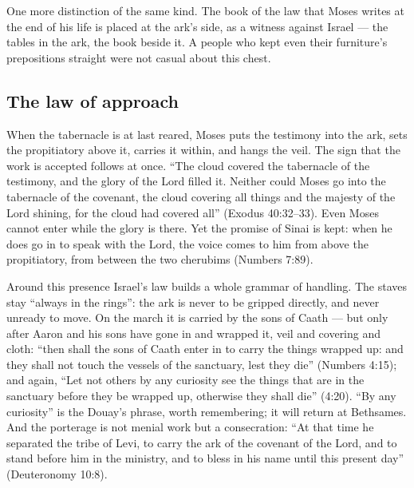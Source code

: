 One more distinction of the same kind. The book of the law that Moses
writes at the end of his life is placed at the ark's side, as a witness
against Israel --- the tables in the ark, the book beside
it. A people who kept even their furniture's
prepositions straight were not casual about this chest.

\par\noindent
\begin{minipage}{\linewidth}

\end{minipage}\par

\subsection{The law of approach}

When the tabernacle is at last reared, Moses puts the testimony into the
ark, sets the propitiatory above it, carries it within, and hangs the veil.
The sign that the work is accepted follows at once. ``The cloud covered
the tabernacle of the testimony, and the glory of the Lord filled it.
Neither could Moses go into the tabernacle of the covenant, the cloud
covering all things and the majesty of the Lord shining, for the cloud had
covered all'' (Exodus 40:32--33). Even Moses cannot enter while the glory is there. Yet the
promise of Sinai is kept: when he does go in to speak with the Lord, the
voice comes to him from above the propitiatory, from between the two
cherubims (Numbers 7:89).

Around this presence Israel's law builds a whole grammar of handling. The
staves stay ``always in the rings'': the ark is never to be gripped
directly, and never unready to move. On the march it is carried by the sons
of Caath --- but only after Aaron and his sons have gone in and wrapped it,
veil and covering and cloth: ``then shall the sons of Caath enter in to
carry the things wrapped up: and they shall not touch the vessels of the
sanctuary, lest they die'' (Numbers 4:15); and again, ``Let not others by
any curiosity see the things that are in the sanctuary before they be
wrapped up, otherwise they shall die'' (4:20). ``By any
curiosity'' is the Douay's phrase, worth remembering; it will return at
Bethsames. And the porterage is not menial work but a consecration: ``At
that time he separated the tribe of Levi, to carry the ark of the covenant
of the Lord, and to stand before him in the ministry, and to bless in his
name until this present day'' (Deuteronomy 10:8).


